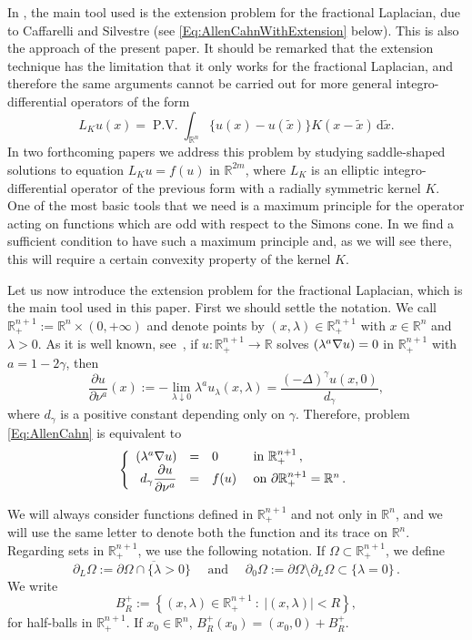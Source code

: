\documentclass[twoside,leqno,symbols-for-thanks, draft]{rmi}
\numberwithin{equation}{section}
\theoremstyle{definition}
\newcommand{\con}[1]{\mathbb{#1}}
\newcommand{\R}{\con{R}} %
\newcommand{\s}{\gamma}
\newcommand{\fraclaplacian}{(-\Delta)^\s}
\renewcommand{\d}{\,\mathrm{d}} %
\newcommand{\setcond}[2]{\left \{ #1 \ : \ #2  \right \}}
\newcommand\beqc[1]{\left\{\begin{array}{#1}}
\newcommand\eeqc{\end{array} \right.}
\def\PDEsystem{rcll}
\DeclareMathOperator{\PV}{P.V.}
\let\div\relax
\DeclareMathOperator{\div}{div}
\begin{document}
In \cite{Cinti-Saddle,Cinti-Saddle2}, the main tool used is the extension problem for the fractional Laplacian, due to Caffarelli and Silvestre \cite{CaffarelliSilvestre} (see \eqref{Eq:AllenCahnWithExtension} below). This is also the approach of the present paper. It should be remarked that the extension technique has the limitation that it only works for the fractional Laplacian, and therefore the same arguments cannot be carried out for more general integro-differential operators of the form
$$
L_K u(x) = \PV \int_{\R^n} \{u(x) - u(\tilde{x})\} K(x-\tilde{x})\d \tilde{x}.
$$
In two forthcoming papers \cite{FelipeSanz-Perela:IntegroDifferentialI,FelipeSanz-Perela:IntegroDifferentialII} we address this problem by studying saddle-shaped solutions to equation $L_K u = f(u)$ in $\R^{2m}$, where $L_K$ is an elliptic integro-differential operator of the previous form with a radially symmetric kernel $K$. One of the most basic tools that we need is a maximum principle for the operator acting on  functions which are odd with respect to the Simons cone. In \cite{FelipeSanz-Perela:IntegroDifferentialI} we find a sufficient condition to have such a maximum principle and, as we will see there, this will require a certain convexity property of the kernel $K$.

Let us now introduce the extension problem for the fractional Laplacian, which is the main tool used in this paper. First we should settle the notation. We call $\R^{n+1}_+ := \R^n \times (0, +\infty)$ and denote points by $(x,\lambda)\in \R^{n+1}_+$ with $x\in \R^n$ and $\lambda > 0$. As it is well known, see~\cite{CaffarelliSilvestre}, if $u:\R^{n+1}_+ \to \R$ solves $\div(\lambda^a \nabla u) = 0$ in $\R^{n+1}_+$ with $a=1-2\s$, then
$$
\dfrac{\partial u}{\partial \nu^a} (x) := -\lim_{\lambda \downarrow 0} \lambda^a u_\lambda (x, \lambda) = \dfrac{\fraclaplacian u (x,0)}{d_\s},
$$
where $d_\s$ is a positive constant depending only on $\s$. Therefore, problem \eqref{Eq:AllenCahn} is equivalent to
\begin{equation}
\label{Eq:AllenCahnWithExtension}
\beqc{\PDEsystem}
\div(\lambda^a \nabla u) &=& 0 & \textrm{ in } \R^{n+1}_+\,, \\
d_\s \dfrac{\partial u}{\partial \nu^a} &=& f(u) & \textrm{ on } \partial \R^{n+1}_+ = \R^n\,.
\eeqc
\end{equation}

We will always consider functions defined in $\R^{n+1}_+$ and not only in $\R^n$, and we will use the same letter to denote both the function and its trace on $\R^n$. Regarding sets in $\R^{n+1}_+$, we use the following notation. If $\Omega \subset \R^{n+1}_+$, we define
\begin{equation}
\label{Eq:DefBoundaries}
\partial_L \Omega := \overline{\partial \Omega \cap \{\lambda > 0\}}
\quad \text{ and } \quad \partial_0 \Omega := \partial \Omega \setminus \partial_L \Omega \subset \{\lambda = 0\}\,.
\end{equation}
We write
$$
B_{R}^+ := \setcond{(x,\lambda)\in \R^{n+1}_+}{|(x,\lambda)|< R},
$$
for half-balls in $\R^{n+1}_+$. If $x_0\in \R^n$, $B_{R}^+(x_0)=(x_0,0)+B_{R}^+$.
\end{document}
